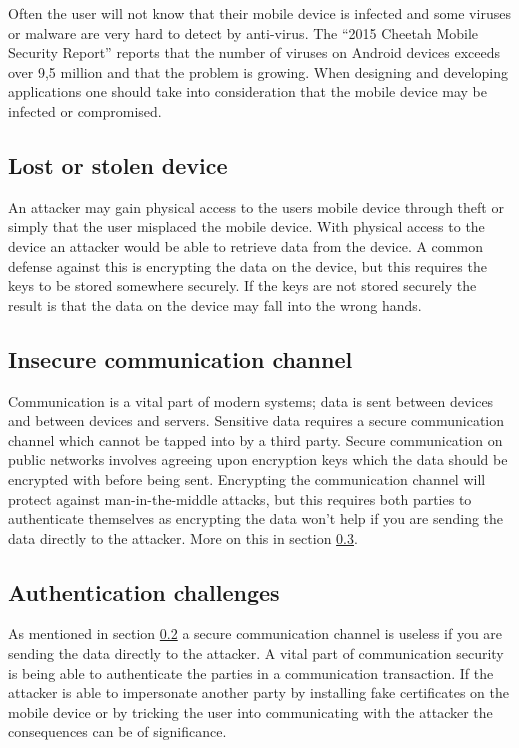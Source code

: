 Often the user will not know that their mobile device is infected and some viruses or malware are very hard to detect by anti-virus. The ``2015 Cheetah Mobile Security Report'' \cite{cheetahSec} reports that the number of viruses on Android devices exceeds over 9,5 million and that the problem is growing. When designing and developing applications one should take into consideration that the mobile device may be infected or compromised.

\subsection{Lost or stolen device}
An attacker may gain physical access to the users mobile device through theft or simply that the user misplaced the mobile device. With physical access to the device an attacker would be able to retrieve data from the device. A common defense against this is encrypting the data on the device, but this requires the keys to be stored somewhere securely. If the keys are not stored securely the result is that the data on the device may fall into the wrong hands.

\subsection{Insecure communication channel}
\label{sec:unsecureCommunication}
Communication is a vital part of modern systems; data is sent between devices and between devices and servers. Sensitive data requires a secure communication channel which cannot be tapped into by a third party. Secure communication on public networks involves agreeing upon encryption keys which the data should be encrypted with before being sent. Encrypting the communication channel will protect against man-in-the-middle attacks, but this requires both parties to authenticate themselves as encrypting the data won't help if you are sending the data directly to the attacker. More on this in section \ref{sec:authenticationChallenges}.

\subsection{Authentication challenges}
\label{sec:authenticationChallenges}
As mentioned in section \ref{sec:unsecureCommunication} a secure communication channel is useless if you are sending the data directly to the attacker. A vital part of communication security is being able to authenticate the parties in a communication transaction. If the attacker is able to impersonate another party by installing fake certificates on the mobile device or by tricking the user into communicating with the attacker the consequences can be of significance.

